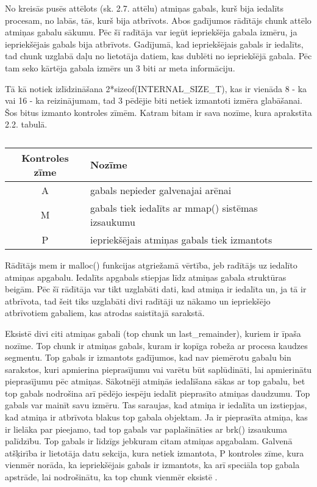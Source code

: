 No kreisās pusēs  attēlots (sk. 2.7. attēlu) \cite{CHOFM} atmiņas gabals, kurš bija iedalīts procesam, no labās, tās, kurš bija atbrīvots.
Abos gadījumos rādītājs chunk attēlo atmiņas gabalu sākumu. Pēc šī radītāja var iegūt iepriekšēja gabala izmēru, ja iepriekšējais gabals bija atbrīvots.
Gadījumā, kad iepriekšējais gabals ir iedalīts, tad chunk uzglabā daļu no lietotāja datiem, kas dublēti no iepriekšējā gabala. 
Pēc tam seko kārtēja gabala izmērs un 3 biti ar meta informāciju. 



Tā kā notiek izlīdzināšana 2*sizeof(INTERNAL\_SIZE\_T), kas ir vienāda 8 - ka vai 16 - ka  reizinājumam, tad 3 pēdējie biti netiek izmantoti izmēra glabāšanai. 
Šos bitus izmanto kontroles zīmēm. Katram bitam ir sava nozīme, kura aprakstīta 2.2. tabulā.

  \begin{table}[H]
\caption{\textbf{\fontsize{11}{12}\selectfont {\\ Atmiņas gabala kontroles zīmes}}} 
\label{table:kysymys}
\centering
	\begin{tabular}{|c|l|r|p{5cm}|}
	  \hline
	Kontroles zīme & Nozīme \\
	\hline
	  A & gabals nepieder galvenajai arēnai \\
      \hline
      M & gabals tiek iedalīts ar mmap() sistēmas izsaukumu \\
      \hline
      P & iepriekšējais atmiņas gabals tiek izmantots  \\
    \hline
	\end{tabular}
\end{table}

Rādītājs mem ir malloc() funkcijas atgriežamā vērtība, jeb radītājs uz iedalīto atmiņas apgabalu. Iedalīts apgabals stiepjas līdz atmiņas gabala struktūras beigām.
Pēc šī rādītāja var tikt uzglabāti dati, kad atmiņa ir iedalīta un, ja tā ir atbrīvota, tad šeit tiks uzglabāti divi radītāji uz nākamo un iepriekšējo atbrīvotiem gabaliem, kas atrodas saistītajā sarakstā. 


Eksistē divi citi atmiņas gabali (top chunk un last\_remainder), kuriem ir īpaša nozīme. 
Top chunk ir atmiņas gabals, kuram ir kopīga robeža ar procesa kaudzes segmentu.
Top gabals ir izmantots gadījumos, kad nav piemērotu gabalu bin sarakstos, kuri apmierina pieprasījumu vai varētu būt saplūdināti, lai apmierinātu pieprasījumu pēc atmiņas.
Sākotnēji atmiņās iedalīšana sākas ar top gabalu, bet top gabals nodrošina arī pēdējo iespēju iedalīt pieprasīto atmiņas daudzumu.
Top gabals var mainīt savu izmēru. Tas saraujas, kad atmiņa ir iedalīta un izstiepjas, kad atmiņa ir atbrīvota blakus top gabala objektam. 
Ja ir pieprasīta atmiņa, kas ir lielāka par pieejamo, tad top gabals var paplašināties ar brk() izsaukuma palīdzību.
Top gabals ir līdzīgs jebkuram citam atmiņas apgabalam. 
Galvenā atšķirība ir lietotāja datu sekcija, kura netiek izmantota, P kontroles zīme, kura vienmēr norāda, ka iepriekšējais gabals ir izmantots, ka arī speciāla top gabala apstrāde, lai nodrošinātu, ka top chunk vienmēr eksistē \cite {BLACKHAT}.

